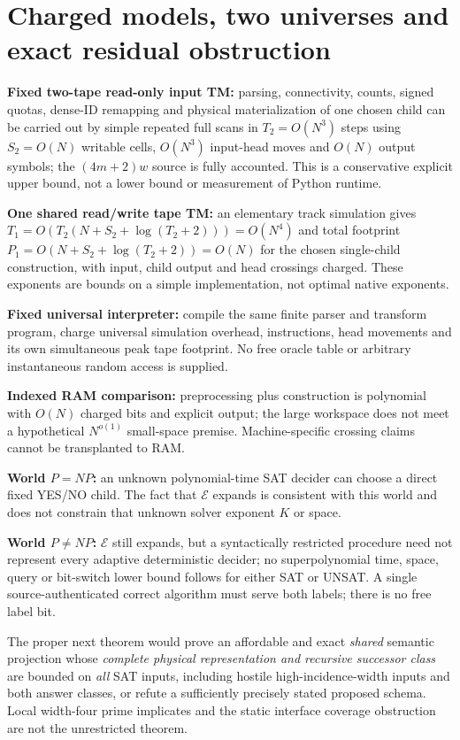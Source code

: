 \documentclass[10pt]{article}
\begin{document}
\section{Charged models, two universes and exact residual obstruction}
\begin{description}[leftmargin=0pt,labelwidth=0pt,itemsep=3pt]
\item[] \textbf{Fixed two-tape read-only input TM:} parsing, connectivity, counts, signed quotas, dense-ID remapping and physical materialization of one chosen child can be carried out by simple repeated full scans in $T_2=O(N^3)$ steps using $S_2=O(N)$ writable cells, $O(N^3)$ input-head moves and $O(N)$ output symbols; the $(4m+2)w$ source is fully accounted. This is a conservative explicit upper bound, not a lower bound or measurement of Python runtime.
\item[] \textbf{One shared read/write tape TM:} an elementary track simulation gives $T_1=O(T_2(N+S_2+\log(T_2+2)))=O(N^4)$ and total footprint $P_1=O(N+S_2+\log(T_2+2))=O(N)$ for the chosen single-child construction, with input, child output and head crossings charged. These exponents are bounds on a simple implementation, not optimal native exponents.
\item[] \textbf{Fixed universal interpreter:} compile the same finite parser and transform program, charge universal simulation overhead, instructions, head movements and its own simultaneous peak tape footprint. No free oracle table or arbitrary instantaneous random access is supplied.
\item[] \textbf{Indexed RAM comparison:} preprocessing plus construction is polynomial with $O(N)$ charged bits and explicit output; the large workspace does not meet a hypothetical $N^{o(1)}$ small-space premise. Machine-specific crossing claims cannot be transplanted to RAM.
\item[] \textbf{World $P=NP$:} an unknown polynomial-time SAT decider can choose a direct fixed YES/NO child. The fact that $\mathcal E$ expands is consistent with this world and does not constrain that unknown solver exponent $K$ or space.
\item[] \textbf{World $P\ne NP$:} $\mathcal E$ still expands, but a syntactically restricted procedure need not represent every adaptive deterministic decider; no superpolynomial time, space, query or bit-switch lower bound follows for either SAT or UNSAT. A single source-authenticated correct algorithm must serve both labels; there is no free label bit.
\end{description}
The proper next theorem would prove an affordable and exact \emph{shared} semantic projection whose \emph{complete physical representation and recursive successor class} are bounded on \emph{all} SAT inputs, including hostile high-incidence-width inputs and both answer classes, or refute a sufficiently precisely stated proposed schema. Local width-four prime implicates and the static interface coverage obstruction are not the unrestricted theorem.
\end{document}
